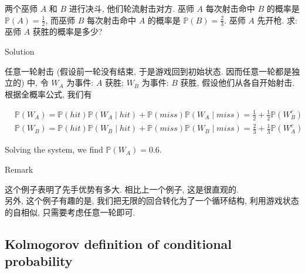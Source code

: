 \documentclass{qlnotes-export}
\begin{document}
\begin{example}[(Wizards)]\label{ex-01-combinatorics-prob-space-wizards}

两个巫师 \(A\) 和 \(B\) 进行决斗, 他们轮流射击对方. 巫师 \(A\) 每次射击命中 \(B\) 的概率是 \({\mathbb{P}}(A) = \frac{1}{2}\), 而巫师 \(B\) 每次射击命中 \(A\) 的概率是 \({\mathbb{P}}(B) = \frac{2}{3}\). 巫师 \(A\) 先开枪. 求: 巫师 \(A\) 获胜的概率是多少?\\

\begin{qlsolution}{Solution}

任意一轮射击 (假设前一轮没有结束, 于是游戏回到初始状态. 因而任意一轮都是独立的) 中, 令 \(W_{A}\) 为事件: \(A\) 获胜; \(W_{B}\) 为事件: \(B\) 获胜, 假设他们从各自开始射击. 根据全概率公式, 我们有

\[\begin{matrix}
 & {{\mathbb{P}}\left( W_{A} \right) = {\mathbb{P}}(hit){\mathbb{P}}\left( {W_{A} \mid hit} \right) + {\mathbb{P}}(miss){\mathbb{P}}\left( {W_{A} \mid miss} \right) = \frac{1}{2} + \frac{1}{2}{\mathbb{P}}\left( W_{B}^{c} \right)} \\
 & {{\mathbb{P}}\left( W_{B} \right) = {\mathbb{P}}(hit){\mathbb{P}}\left( {W_{B} \mid hit} \right) + {\mathbb{P}}(miss){\mathbb{P}}\left( {W_{B} \mid miss} \right) = \frac{2}{3} + \frac{1}{3}{\mathbb{P}}\left( W_{A}^{c} \right)}
\end{matrix}\]

Solving the system, we find \({\mathbb{P}}\left( W_{A} \right) = 0.6\).

\end{qlsolution}

\begin{qlremark}{Remark}

这个例子表明了先手优势有多大. 相比上一个例子, 这是很直观的.\\
另外, 这个例子有趣的是, 我们把无限的回合转化为了一个循环结构, 利用游戏状态的自相似, 只需要考虑任意一轮即可.

\end{qlremark}

\end{example}

\subsection{Kolmogorov definition of conditional probability}\label{kolmogorov-definition-of-conditional-probability}
\end{document}

